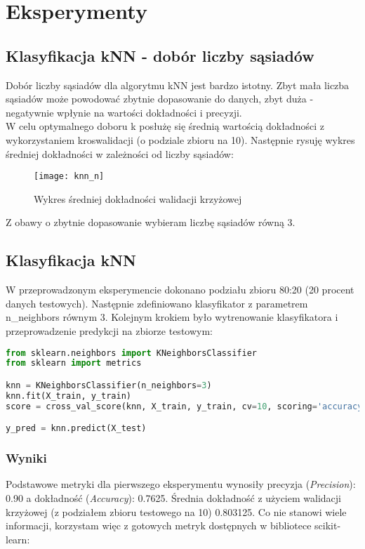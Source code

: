 \section{Eksperymenty}
\subsection{Klasyfikacja kNN - dobór liczby sąsiadów}
Dobór liczby sąsiadów dla algorytmu kNN jest bardzo istotny. Zbyt mała liczba sąsiadów może powodować zbytnie dopasowanie do danych, zbyt duża - negatywnie wpłynie na wartości dokładności i precyzji.\\

W celu optymalnego doboru k posłużę się średnią wartością dokładności z wykorzystaniem kroswalidacji (o podziale zbioru na 10). Następnie rysuję wykres średniej dokładności w zależności od liczby sąsiadów:

\begin{figure}[H]
    \centering
    \texttt{[image: knn\_n]}
    \caption{Wykres średniej dokładności walidacji krzyżowej}
    \label{fig:knn_n}
\end{figure}

Z obawy o zbytnie dopasowanie wybieram liczbę sąsiadów równą 3.

\subsection{Klasyfikacja kNN }
W przeprowadzonym eksperymencie dokonano podziału zbioru 80:20 (20 procent danych testowych). Następnie zdefiniowano klasyfikator z parametrem n\_neighbors równym 3. Kolejnym krokiem było wytrenowanie klasyfikatora i przeprowadzenie predykcji na zbiorze testowym:\\

\begin{lstlisting}[language=Python, caption=Definicja i użycie kNN]
from sklearn.neighbors import KNeighborsClassifier
from sklearn import metrics

knn = KNeighborsClassifier(n_neighbors=3)
knn.fit(X_train, y_train)
score = cross_val_score(knn, X_train, y_train, cv=10, scoring='accuracy')

y_pred = knn.predict(X_test)
\end{lstlisting}

\subsubsection{Wyniki}
Podstawowe metryki dla pierwszego eksperymentu wynosiły precyzja (\textit{Precision}): 0.90 a dokładność (\textit{Accuracy}): 0.7625. Średnia dokładność z użyciem walidacji krzyżowej (z podziałem zbioru testowego na 10) 0.803125. Co nie stanowi wiele informacji, korzystam więc z gotowych metryk dostępnych w bibliotece scikit-learn:\\

